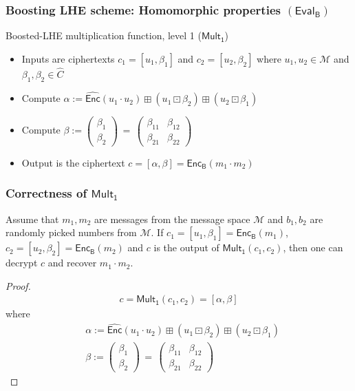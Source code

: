 \documentclass{beamer}
\begin{document}
\begin{frame}[t]
\frametitle{Boosting LHE scheme: Homomorphic properties $(\mathsf{Eval_{B}})$}

\begin{block}{Boosted-LHE multiplication function, level 1 ($\mathsf{Mult_1}$)}
\begin{itemize}
\item Inputs are ciphertexts $ c_1=[u_1,\beta_1]$ and $c_2=[u_2,\beta_2]$ where $ u_1,u_2 \in \mathcal{M}$ and $ \beta_1,\beta_2 \in \widehat{C}$
\item Compute $\alpha :=\mathsf{ \widehat{\mathsf{Enc}}}(u_1\cdot u_2) \boxplus(u_1 \boxdot \beta_2) \boxplus (u_2 \boxdot \beta_1)$
\item Compute  $\beta := \left(\begin{array}{c} \beta_1 \\ \beta_2 \end{array} \right) \, 
=\, \left(\begin{array}{cc} \beta_{11} & \beta_{12} \\ \beta_{21} & \beta_{22} \end{array} \right)$ 
\item Output is the ciphertext $c=[\alpha,\beta]=\mathsf{Enc_B}(m_1\cdot m_2)$
\end{itemize} 
\end{block}
\end{frame}

\begin{frame}[t]
\frametitle{Correctness of $\mathsf{Mult_1}$}
\begin{theorem}
Assume that $m_1, m_2$ are messages from the message space $\mathcal{M}$ and $b_1,b_2$ are randomly picked numbers from $\mathcal{M}$. If $c_1=[u_1, \beta_1]=\mathsf{Enc_B}(m_1)$, $c_2=[u_2, \beta_2]=\mathsf{Enc_B}(m_2)$ and $c$ is the output of $\mathsf{Mult_1}(c_1,c_2)$, then one can decrypt $c$ and recover $m_1\cdot m_2$. 
\end{theorem}
\begin{proof}
\begin{align*}
c=\mathsf{Mult_1}(c_1,c_2)=[\alpha,\beta] \nonumber
\end{align*}
where
\begin{align*}
& \alpha :=\mathsf{ \widehat{\mathsf{Enc}}}(u_1\cdot u_2) \boxplus(u_1 \boxdot \beta_2) \boxplus (u_2 \boxdot \beta_1) \label{s: eqn10} \\
 & \beta := \left(\begin{array}{c} \beta_1 \\ \beta_2 \end{array} \right) \, =\, \left(\begin{array}{cc} \beta_{11} & \beta_{12} \\ \beta_{21} & \beta_{22} \end{array} \right)
\end{align*} 
\end{proof}

\end{frame}
\end{document}
